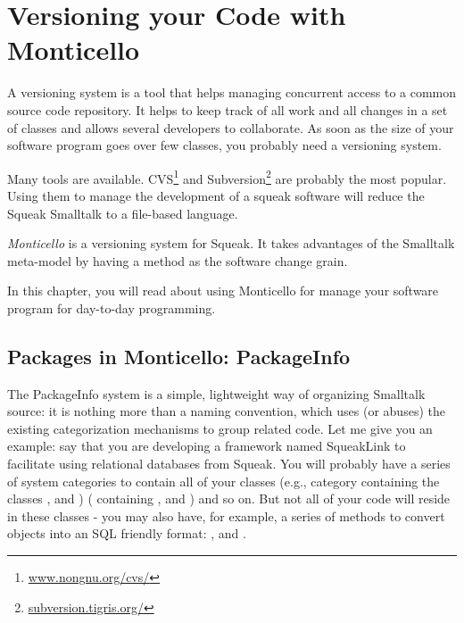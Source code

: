 \documentclass[a4paper,10pt,twoside]{book}
\begin{document}
	\renewcommand{\nnbb}[2]{} %
	\sloppy
\fi
\chapter{Versioning your Code with Monticello}

A versioning system is a tool that helps managing concurrent access to a common source code repository. It helps to keep track of all work and all changes in a set of classes and allows several developers to collaborate. As soon as the size of your software program goes over few classes, you probably need a versioning system.

Many tools are available. CVS\footnote{\href{http://www.nongnu.org/cvs/}{www.nongnu.org/cvs/}} and Subversion\footnote{\href{http://subversion.tigris.org/}{subversion.tigris.org/}} are probably the most popular. Using them to manage the development of a squeak software will reduce the Squeak Smalltalk to a file-based language. 

\emph{Monticello} is a versioning system for Squeak. It takes advantages of the Smalltalk meta-model by having a method as the software change grain. 

In this chapter, you will read about using Monticello for manage your software program for day-to-day programming.

\section{Packages in Monticello: PackageInfo}

The PackageInfo system is a simple, lightweight way of organizing Smalltalk source: it is nothing more than a naming convention, which uses (or abuses) the existing categorization mechanisms to group related code. Let me give you an example: say that you are developing a framework named SqueakLink to facilitate using relational databases from Squeak. You will probably have a series of system categories to contain all of your classes (e.g., category  containing the classes ,  and )
( containing ,   and ) and so on. But not all of your code will reside in these classes - you may also have, for example, a series of methods to convert objects into an SQL friendly format: ,   and .
\end{document}
